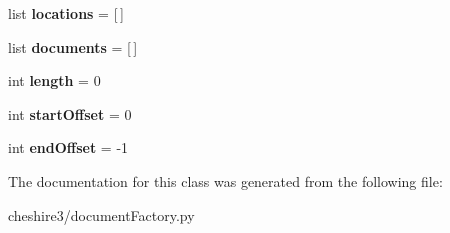 \begin{DoxyCompactItemize}
\item 
\hypertarget{classcheshire3_1_1document_factory_1_1_base_document_stream_affb51a277688ee33fd8c5df6f17acfd2}{list {\bfseries locations} = \mbox{[}$\,$\mbox{]}}\label{classcheshire3_1_1document_factory_1_1_base_document_stream_affb51a277688ee33fd8c5df6f17acfd2}

\item 
\hypertarget{classcheshire3_1_1document_factory_1_1_base_document_stream_a54b01ca9f95a31ca99adb9f1a5e53993}{list {\bfseries documents} = \mbox{[}$\,$\mbox{]}}\label{classcheshire3_1_1document_factory_1_1_base_document_stream_a54b01ca9f95a31ca99adb9f1a5e53993}

\item 
\hypertarget{classcheshire3_1_1document_factory_1_1_base_document_stream_abf98184251df7a682c721ca28158cdac}{int {\bfseries length} = 0}\label{classcheshire3_1_1document_factory_1_1_base_document_stream_abf98184251df7a682c721ca28158cdac}

\item 
\hypertarget{classcheshire3_1_1document_factory_1_1_base_document_stream_a46dabe5e2e24b809ee54e578bdc1ca67}{int {\bfseries start\-Offset} = 0}\label{classcheshire3_1_1document_factory_1_1_base_document_stream_a46dabe5e2e24b809ee54e578bdc1ca67}

\item 
\hypertarget{classcheshire3_1_1document_factory_1_1_base_document_stream_aea497ede8f522ca3ab4d23b6a66ff895}{int {\bfseries end\-Offset} = -\/1}\label{classcheshire3_1_1document_factory_1_1_base_document_stream_aea497ede8f522ca3ab4d23b6a66ff895}

\end{DoxyCompactItemize}


The documentation for this class was generated from the following file\-:\begin{DoxyCompactItemize}
\item 
cheshire3/document\-Factory.\-py\end{DoxyCompactItemize}
